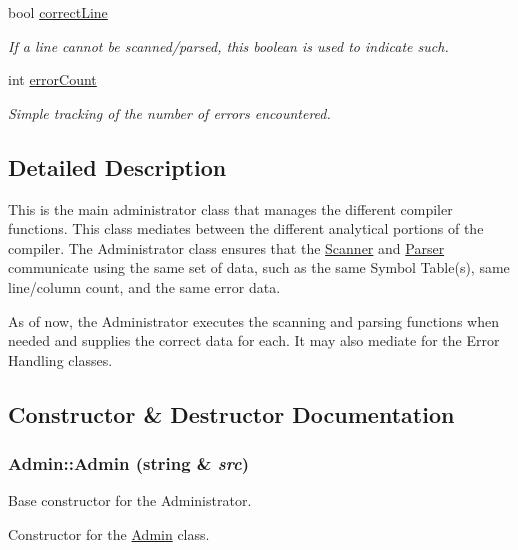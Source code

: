 \begin{DoxyCompactItemize}
bool \hyperlink{classAdmin_a18dd34f91c28721e9ba9ec9370ae5f98}{correctLine}
\begin{DoxyCompactList}\small\item\em If a line cannot be scanned/parsed, this boolean is used to indicate such. \item\end{DoxyCompactList}\item 
int \hyperlink{classAdmin_ae29edcd0464b203b35f72caba6af7295}{errorCount}
\begin{DoxyCompactList}\small\item\em Simple tracking of the number of errors encountered. \item\end{DoxyCompactList}\end{DoxyCompactItemize}


\subsection{Detailed Description}
This is the main administrator class that manages the different compiler functions. This class mediates between the different analytical portions of the compiler. The Administrator class ensures that the \hyperlink{classScanner}{Scanner} and \hyperlink{classParser}{Parser} communicate using the same set of data, such as the same Symbol Table(s), same line/column count, and the same error data.

As of now, the Administrator executes the scanning and parsing functions when needed and supplies the correct data for each. It may also mediate for the Error Handling classes. 

\subsection{Constructor \& Destructor Documentation}
\hypertarget{classAdmin_a5b1a3a537008af6065e9cb55522b7a67}{
\subsubsection[{Admin}]{\setlength{\rightskip}{0pt plus 5cm}Admin::Admin (string \& {\em src})}}
\label{classAdmin_a5b1a3a537008af6065e9cb55522b7a67}


Base constructor for the Administrator. 

Constructor for the \hyperlink{classAdmin}{Admin} class.

